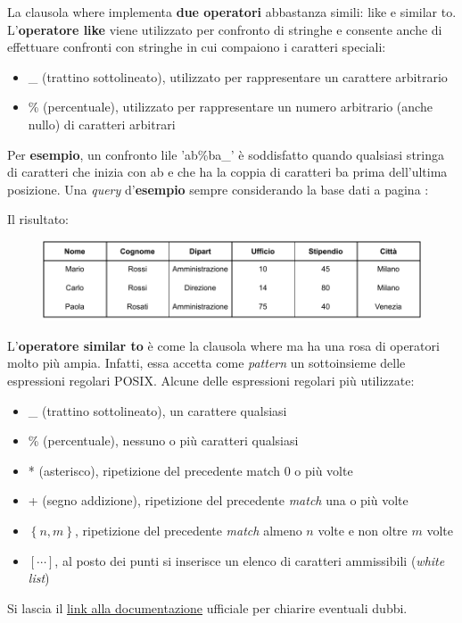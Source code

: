 \documentclass[a4paper]{article}
\begin{document}
	La clausola \textsf{where} implementa \textbf{due operatori} abbastanza simili: \textsf{like} e \textsf{similar to}. L'\textbf{operatore \textsf{like}} viene utilizzato per confronto di stringhe e consente anche di effettuare confronti con stringhe in cui compaiono i caratteri speciali:
	\begin{itemize}
		\item \_ (trattino sottolineato), utilizzato per rappresentare un carattere arbitrario
		\item \% (percentuale), utilizzato per rappresentare un numero arbitrario (anche nullo) di caratteri arbitrari
	\end{itemize}
	Per \textcolor{Green4}{\textbf{esempio}}, un confronto \textsf{lile 'ab\%ba\_'} è soddisfatto quando qualsiasi stringa di caratteri che inizia con \textsf{ab} e che ha la coppia di caratteri \textsf{ba} prima dell'ultima posizione. Una \emph{query} d'\textcolor{Green4}{\textbf{esempio}} sempre considerando la base dati a pagina \pageref{img: select dbms}:
	
	Il risultato:
	\begin{figure}[!htp]
		\centering
		\includegraphics[width=\textwidth]{img/where-ex4.pdf}
	\end{figure}\:\newline

	\noindent
	L'\textbf{operatore \textsf{similar to}} è come la clausola \textsf{where} ma ha una rosa di operatori molto più ampia. Infatti, essa accetta come \emph{pattern} un sottoinsieme delle espressioni regolari POSIX. Alcune delle espressioni regolari più utilizzate:
	\begin{itemize}
		\item \_ (trattino sottolineato), un carattere qualsiasi
		\item \% (percentuale), nessuno o più caratteri qualsiasi
		\item * (asterisco), ripetizione del precedente match $0$ o più volte
		\item + (segno addizione), ripetizione del precedente \emph{match} una o più volte
		\item $\left\{n,m\right\}$, ripetizione del precedente \emph{match} almeno $n$ volte e non oltre $m$ volte
		\item $\left[\cdots\right]$, al posto dei punti si inserisce un elenco di caratteri ammissibili (\emph{white list})
	\end{itemize}
	Si lascia il \href{https://www.postgresql.org/docs/current/functions-matching.html#FUNCTIONS-SIMILARTO-REGEXP}{link alla documentazione} ufficiale per chiarire eventuali dubbi.\newpage
	
\end{document}
